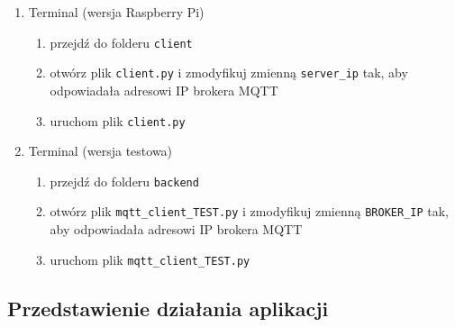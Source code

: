 \begin{enumerate}
{  }
  \item{
    Terminal (wersja Raspberry Pi)
    \begin{enumerate}
      \item{przejdź do folderu \verb|client|}
      \item{otwórz plik \verb|client.py| i zmodyfikuj zmienną \verb|server_ip| tak, aby odpowiadała adresowi IP brokera MQTT}
      \item{uruchom plik \verb|client.py|}
    \end{enumerate}
  }
  \item{
    Terminal (wersja testowa)
    \begin{enumerate}
      \item{przejdź do folderu \verb|backend|}
      \item{otwórz plik \verb|mqtt_client_TEST.py| i zmodyfikuj zmienną \verb|BROKER_IP| tak, aby odpowiadała adresowi IP brokera MQTT}
      \item{uruchom plik \verb|mqtt_client_TEST.py|}
    \end{enumerate}
  }
\end{enumerate}
\subsection{Przedstawienie działania aplikacji}

